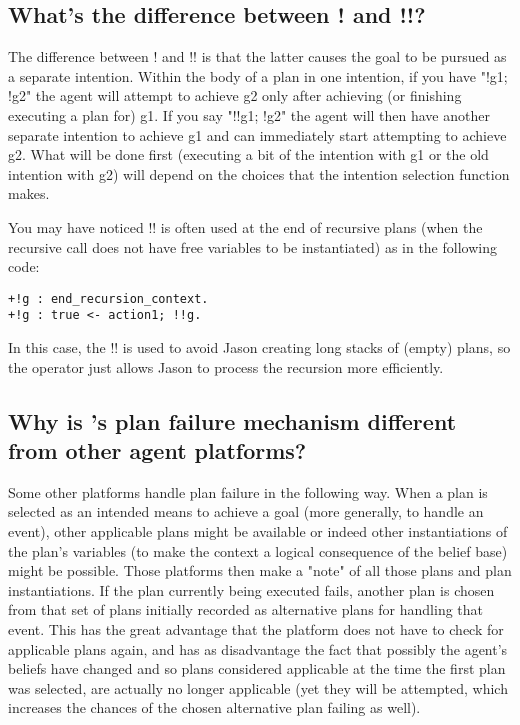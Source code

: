 \documentclass{article}
\newcommand{\jason}[0]{\htlink{\textit{Jason}}{http://jason.sf.net}\xspace}
\begin{document}
\begin{description}
\subsection{What's the difference between ! and !!?}

The difference between ! and !! is that the latter causes the goal to
be pursued as a separate intention. Within the body of a plan in one
intention, if you have "!g1; !g2" the agent will attempt to achieve g2
only after achieving (or finishing executing a plan for) g1.  If you
say "!!g1; !g2" the agent will then have another separate intention to
achieve g1 and can immediately start attempting to achieve g2. What
will be done first (executing a bit of the intention with g1 or the
old intention with g2) will depend on the choices that the intention
selection function makes. 

You may have noticed !! is often used at the end of recursive plans
(when the recursive call does not have free variables to be
instantiated) as in the following code:
\begin{verbatim}
+!g : end_recursion_context.
+!g : true <- action1; !!g.
\end{verbatim}
In this case, the !! is used to avoid Jason creating long stacks of
(empty) plans, so the operator just allows Jason to process the
recursion more efficiently.


\subsection{Why is \jason's plan failure mechanism different from
  other agent platforms?}

Some other platforms handle plan failure in the following way. When a
plan is selected as an intended means to achieve a goal (more
generally, to handle an event), other applicable plans might be
available or indeed other instantiations of the plan's variables (to
make the context a logical consequence of the belief base) might be
possible. Those platforms then make a "note" of all those plans and
plan instantiations. If the plan currently being executed fails,
another plan is chosen from that set of plans initially recorded as
alternative plans for handling that event. This has the great
advantage that the platform does not have to check for applicable
plans again, and has as disadvantage the fact that possibly the
agent's beliefs have changed and so plans considered applicable at the
time the first plan was selected, are actually no longer applicable
(yet they will be attempted, which increases the chances of the chosen
alternative plan failing as well).


\end{description}
\end{document}
